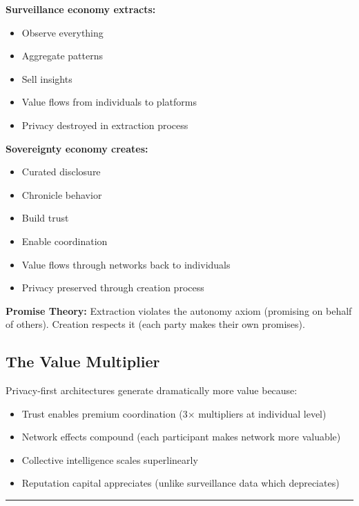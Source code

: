 \documentclass[
]{article}
\begin{document}
\textbf{Surveillance economy extracts:}

\begin{itemize}
\item
  Observe everything
\item
  Aggregate patterns
\item
  Sell insights
\item
  Value flows from individuals to platforms
\item
  Privacy destroyed in extraction process
\end{itemize}

\textbf{Sovereignty economy creates:}

\begin{itemize}
\item
  Curated disclosure
\item
  Chronicle behavior
\item
  Build trust
\item
  Enable coordination
\item
  Value flows through networks back to individuals
\item
  Privacy preserved through creation process
\end{itemize}

\textbf{Promise Theory:} Extraction violates the autonomy axiom
(promising on behalf of others). Creation respects it (each party makes
their own promises).

\subsection{The Value Multiplier}\label{the-value-multiplier}

Privacy-first architectures generate dramatically more value because:

\begin{itemize}
\item
  Trust enables premium coordination (3× multipliers at individual
  level)
\item
  Network effects compound (each participant makes network more
  valuable)
\item
  Collective intelligence scales superlinearly
\item
  Reputation capital appreciates (unlike surveillance data which
  depreciates)
\end{itemize}

\begin{center}\rule{0.5\linewidth}{0.5pt}\end{center}
\end{document}
